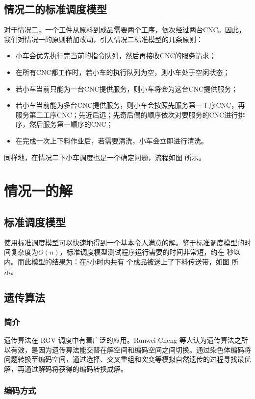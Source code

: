 \documentclass{cumcmthesis}
\begin{document}
	\subsection{情况二的标准调度模型}
	对于情况二，一个工件从原料到成品需要两个工序，依次经过两台CNC。因此，我们对情况一的原则稍加改动，引入情况二标准模型的几条原则：
	\begin{itemize}
		\item 小车会优先执行完当前的指令队列，然后再接收CNC的服务请求；
		\item 在所有CNC都工作时，若小车的执行队列为空，则小车处于空闲状态；
		\item 若小车当前只能为一台CNC提供服务，则小车将会为这台CNC提供服务；
		\item 若小车当前能为多台CNC提供服务，则小车会按照先服务第一工序CNC，再服务第二工序CNC；先近后远；先奇后偶的顺序依次对要服务的CNC进行排序，然后服务第一顺序的CNC；
		\item 在完成一次上下料作业后，若需要清洗，小车会立即进行清洗。
	\end{itemize}
	同样地，在情况二下小车调度也是一个确定问题，流程如图 所示。

	\section{情况一的解}
	\subsection{标准调度模型}
	使用标准调度模型可以快速地得到一个基本令人满意的解。鉴于标准调度模型的时间复杂度为\(O(n)\)，标准调度模型测试程序运行需要的时间非常短，约在 秒以内。而此模型的结果为：在8小时内共有 个成品被送上了下料传送带，如图 所示。
	
	\subsection{遗传算法}
	
	\subsubsection{简介}

	遗传算法在 RGV 调度中有着广泛的应用。Runwei Cheng 等人认为\cite{chenrunwei}遗传算法之所以有效，是因为遗传算法能交替在解空间和编码空间之间切换。通过染色体编码将问题转换至编码空间，通过选择、交叉重组和突变等模拟自然遗传的过程寻找最优解，再通过解码将获得的编码转换成解。

	\subsubsection{编码方式}
\end{document}
